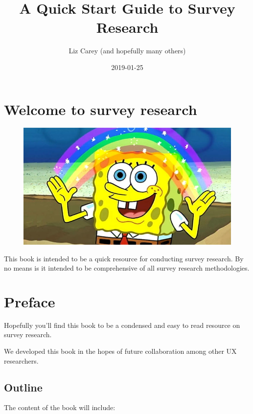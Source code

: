 \documentclass[]{book}
\title{A Quick Start Guide to Survey Research}
\author{Liz Carey (and hopefully many others)}
\date{2019-01-25}
\begin{document}
\maketitle

{
\hypersetup{linkcolor=black}
\setcounter{tocdepth}{1}
\tableofcontents
}
\chapter*{Welcome to survey research}\label{welcome-to-survey-research}

\begin{figure}
\centering
\includegraphics{figs/sponge_bob.png}
\caption{}
\end{figure}

This book is intended to be a quick resource for conducting survey
research. By no means is it intended to be comprehensive of all survey
research methodologies.

\chapter*{Preface}\label{preface}

Hopefully you'll find this book to be a condensed and easy to read
resource on survey research.

We developed this book in the hopes of future collaboration among other
UX researchers.

\section*{Outline}\label{outline}

The content of the book will include:
\end{document}
